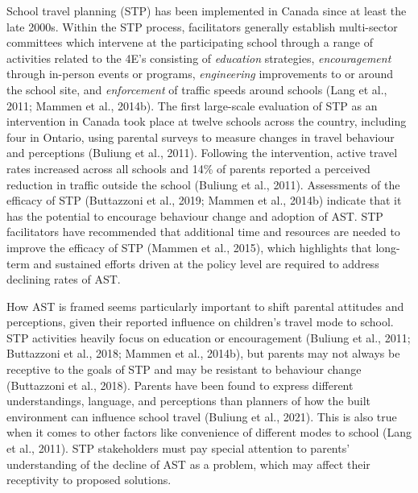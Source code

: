 \documentclass[]{elsarticle} %
\begin{document}
School travel planning (STP) has been implemented in Canada since at
least the late 2000s. Within the STP process, facilitators generally
establish multi-sector committees which intervene at the participating
school through a range of activities related to the 4E's consisting of
\emph{education} strategies, \emph{encouragement} through in-person
events or programs, \emph{engineering} improvements to or around the
school site, and \emph{enforcement} of traffic speeds around schools
(Lang et al., 2011; Mammen et al., 2014b). The first large-scale
evaluation of STP as an intervention in Canada took place at twelve
schools across the country, including four in Ontario, using parental
surveys to measure changes in travel behaviour and perceptions (Buliung
et al., 2011). Following the intervention, active travel rates increased
across all schools and 14\% of parents reported a perceived reduction in
traffic outside the school (Buliung et al., 2011). Assessments of the
efficacy of STP (Buttazzoni et al., 2019; Mammen et al., 2014b) indicate
that it has the potential to encourage behaviour change and adoption of
AST. STP facilitators have recommended that additional time and
resources are needed to improve the efficacy of STP (Mammen et al.,
2015), which highlights that long-term and sustained efforts driven at
the policy level are required to address declining rates of AST.

How AST is framed seems particularly important to shift parental
attitudes and perceptions, given their reported influence on children's
travel mode to school. STP activities heavily focus on education or
encouragement (Buliung et al., 2011; Buttazzoni et al., 2018; Mammen et
al., 2014b), but parents may not always be receptive to the goals of STP
and may be resistant to behaviour change (Buttazzoni et al., 2018).
Parents have been found to express different understandings, language,
and perceptions than planners of how the built environment can influence
school travel (Buliung et al., 2021). This is also true when it comes to
other factors like convenience of different modes to school (Lang et
al., 2011). STP stakeholders must pay special attention to parents'
understanding of the decline of AST as a problem, which may affect their
receptivity to proposed solutions.
\end{document}
